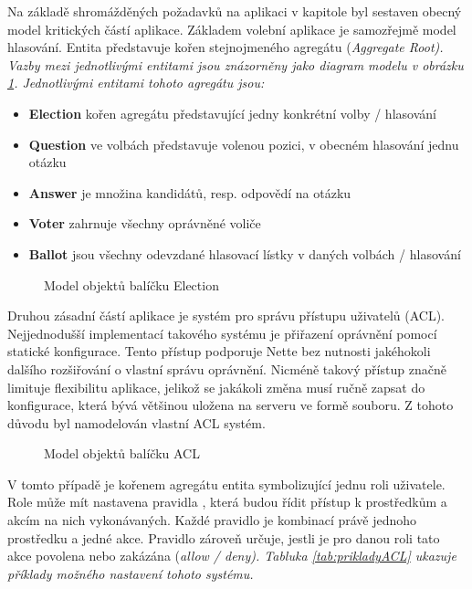 Na základě shromážděných požadavků na aplikaci v kapitole  byl sestaven obecný model kritických částí aplikace. Základem volební aplikace je samozřejmě model hlasování. Entita  představuje kořen stejnojmeného agregátu (\it{Aggregate Root}). Vazby mezi jednotlivými entitami jsou znázorněny jako diagram modelu v obrázku \ref{fig:ElectionModel}. Jednotlivými entitami tohoto agregátu jsou: 
\begin{itemize}
	\item \textbf{Election} kořen agregátu představující jedny konkrétní volby / hlasování
	\item \textbf{Question} ve volbách představuje volenou pozici, v obecném hlasování jednu otázku
	\item \textbf{Answer} je množina kandidátů, resp. odpovědí na otázku
	\item \textbf{Voter} zahrnuje všechny oprávněné voliče
	\item \textbf{Ballot} jsou všechny odevzdané hlasovací lístky v daných volbách / hlasování
\end{itemize}

\begin{figure}[h]
		\centering \tiny {}\selectfont
		\def\svgwidth{0.5\columnwidth}
		
		\normalsize \sffamily
		\captionsetup{width=\linewidth}
		\caption{Model objektů balíčku Election}
		\label{fig:ElectionModel}
\end{figure}
\clearpage

Druhou zásadní částí aplikace je systém pro správu přístupu uživatelů (ACL). Nejjednodušší implementací takového systému je přiřazení oprávnění pomocí statické konfigurace. Tento přístup podporuje Nette bez nutnosti jakéhokoli dalšího rozšiřování o vlastní správu oprávnění. Nicméně takový přístup značně limituje flexibilitu aplikace, jelikož se jakákoli změna musí ručně zapsat do konfigurace, která bývá většinou uložena na serveru ve formě souboru. Z tohoto důvodu byl namodelován vlastní ACL systém.

\begin{figure}[h]
		\centering \tiny {}\selectfont
		\def\svgwidth{0.6\columnwidth}
		
		\normalsize \sffamily
		\captionsetup{width=\linewidth}
		\caption{Model objektů balíčku ACL}
		\label{fig:AclModel}
\end{figure}

V tomto případě je kořenem agregátu entita  symbolizující jednu roli uživatele. Role může mít nastavena pravidla , která budou řídit přístup k prostředkům  a akcím  na nich vykonávaných. Každé pravidlo je kombinací právě jednoho prostředku a jedné akce. Pravidlo zároveň určuje, jestli je pro danou roli tato akce povolena nebo zakázána (\it{allow / deny}). Tabluka \ref{tab:prikladyACL} ukazuje příklady možného nastavení tohoto systému.


